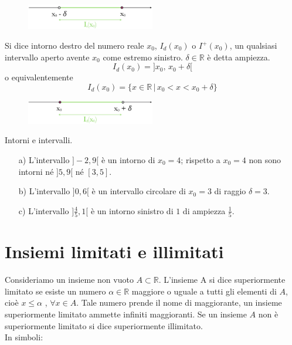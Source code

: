 \begin{figure}[htpb!]
  \centering
  \includegraphics[width=0.5\textwidth]{img/top_3.png}%
\end{figure}

\begin{definizione}
  Si dice intorno destro del numero reale \(x_0\), \(I_d(x_0)\) o 
\(I^+(x_0)\), un qualsiasi intervallo aperto avente \(x_0\) come estremo 
sinistro. \(\delta\in\mathbb{R}\) è detta ampiezza.\\
\begin{equation}
  I_d(x_0)=]x_0,\,x_0+\delta[
\end{equation}
o equivalentemente
\begin{equation}
  I_d(x_0)=\{x\in \mathbb{R}\,\vert\, x_0 < x<x_0+\delta\}
\end{equation}
\end{definizione}

\begin{figure}[htpb!]
  \centering
  \includegraphics[width=0.5\textwidth]{img/top_4a.png}%
\end{figure}

\begin{esempio} Intorni e intervalli.
\begin{itemize}
  \item[a)] L'intervallo \(]-2, 9[\) è un intorno di \(x_0=4\); rispetto a 
\(x_0=4\) non sono intorni né \(]5, 9[\) né \([3, 5]\).\\
  \item[b)] L'intervallo \(]0, 6[\) è un intervallo circolare di \(x_0=3\) 
di raggio \(\delta=3\).\\
  \item[c)] L'intervallo \(]\frac{4}{5},1[\) è un intorno sinistro di \(1\) 
di ampiezza \(\frac{1}{5}\). \\
\end{itemize}
\end{esempio}

\section{Insiemi limitati e illimitati}
Consideriamo un insieme non vuoto \(A\subset \mathbb{R}\). L'insieme A si dice 
superiormente limitato se esiste un numero \(\alpha \in \mathbb{R}\) maggiore o 
uguale a tutti gli elementi di \(A\), cioè \(x\leq\alpha\) , \(\forall x\in A\). 
Tale numero prende il nome di maggiorante, un insieme superiormente limitato 
ammette infiniti maggioranti. Se un insieme \(A\) non è superiormente limitato 
si dice superiormente illimitato.\\
In simboli:\\


